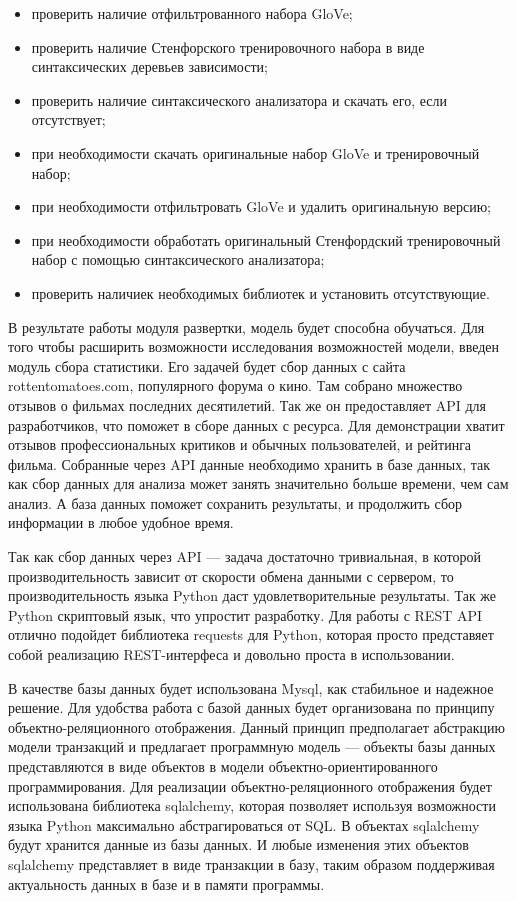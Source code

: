 \begin{itemize}
\item проверить наличие отфильтрованного набора GloVe;
\item проверить наличие Стенфорского тренировочного набора в виде синтаксических деревьев зависимости;
\item проверить наличие синтаксического анализатора и скачать его, если отсутствует;
\item при необходимости скачать оригинальные набор GloVe и тренировочный набор;
\item при необходимости отфильтровать GloVe и удалить оригинальную версию;
\item при необходимости обработать оригинальный Стенфордский тренировочный набор с помощью синтаксического анализатора;
\item проверить наличиек необходимых библиотек и установить отсутствующие.
\end{itemize}

В результате работы модуля развертки, модель будет способна обучаться. Для того чтобы расширить возможности исследования возможностей модели, введен модуль сбора статистики. Его задачей будет сбор данных с сайта rottentomatoes.com, популярного форума о кино. Там собрано множество отзывов о фильмах последних десятилетий. Так же он предоставляет API для разработчиков, что поможет в сборе данных с ресурса. Для демонстрации хватит отзывов профессиональных критиков и обычных пользователей, и рейтинга фильма. Собранные через API данные необходимо хранить в базе данных, так как сбор данных для анализа может занять значительно больше времени, чем сам анализ. А база данных поможет сохранить результаты, и продолжить сбор информации в любое удобное время.

Так как сбор данных через API --- задача достаточно тривиальная, в которой производительность зависит от скорости обмена данными с сервером, то производительность языка Python даст удовлетворительные результаты. Так же Python скриптовый язык, что упростит разработку. Для работы с REST API отлично подойдет библиотека requests для Python, которая просто представяет собой реализацию REST-интерфеса и довольно проста в использовании.

В качестве базы данных будет использована Mysql, как стабильное и надежное решение. Для удобства работа с базой данных будет организована по принципу объектно-реляционного отображения. Данный принцип предполагает абстракцию модели транзакций и предлагает программную модель --- объекты базы данных представляются в виде объектов в модели объектно-ориентированного программирования. Для реализации объектно-реляционного отображения будет использована библиотека sqlalchemy, которая позволяет используя возможности языка Python максимально абстрагироваться от SQL\@. В объектах sqlalchemy будут хранится данные из базы данных. И любые изменения этих объектов sqlalchemy представляет в виде транзакции в базу, таким образом поддерживая актуальность данных в базе и в памяти программы.

